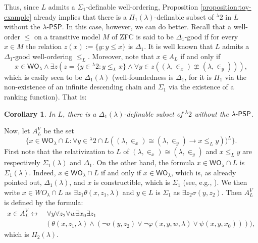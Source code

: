 \documentclass{amsart}
\numberwithin{equation}{section}
\def\hyp{{\hbox{-}}}
\newtheorem{corollary}[theorem]{Corollary}
\theoremstyle{definition}
\theoremstyle{remark}
\begin{document}
Thus, since $L$ admits a $\Sigma_1$-definable well-ordering, Proposition \ref{proposition:toy-example} already implies that there is a $\Pi_1(\lambda)$-definable subset of ${}^{\lambda}2$ in $L$ without the $\lambda$-$\mathsf{PSP}$. In this case, however, we can do better. Recall that a well-order $\leq$ on a transitive model $M$ of \textsf{ZFC} is said to be $\Delta_1$-good if for every $x\in M$ the relation $z(x):=\{y:y\leq x\}$ is $\Delta_1$. It is well known that $L$ admits a $ \Delta_1$-good well-ordering $\leq_L$.  
Moreover, note that $x\in A_L$ if and only if
\[
x\in\mathsf{WO}_\lambda\wedge\exists z(z=\{y\in{}^{\lambda}2:y\leq_{L}x\}\wedge \forall y\in z((\lambda,\in_x)\ncong(\lambda,\in_y))),
\]
which is easily seen to be $\Delta_1(\lambda)$ (well-foundedness is $\Delta_1$, for it is $\Pi_1$ via the non-existence of an infinite descending chain and $\Sigma_1$ via the existence of a ranking function). That is:

\begin{corollary}\label{corollary:toy-example-Delta_1-definable-subset-wo-psp} In $L$, there is a $\Delta_1(\lambda)$-definable subset of ${}^{\lambda}2$ without the $\lambda\hyp\mathsf{PSP}$.
\end{corollary}


Now, let $A_{L}^{V}$ be the set
$$\{x\in \mathsf{WO}_{\lambda}\cap L:\forall y\in{}^{\lambda}2\cap L((\lambda,\in_x)\cong(\lambda,\in_y)\rightarrow x\leq_{L}y))^{L}\}.$$
First note that the relativization to $L$ of $(\lambda,\in_x)\cong(\lambda,\in_y)$ and $x\leq_{L}y$ are respectively $\Sigma_1(\lambda)$ and $\Delta_1$.  On the other hand, the formula $x\in \mathsf{WO}_{\lambda}\cap L$ is $\Sigma_1(\lambda)$. Indeed, $x\in \mathsf{WO}_{\lambda}\cap L$ if and only if $x\in \mathsf{WO}_{\lambda}$, which is, as already pointed out, $\Delta_1(\lambda)$, and $x$ is constructible, which is $\Sigma_1$ (see, e.g., \cite[Lemma 2.13]{Devlin}). We then write $x\in WO_{\lambda}\cap L$ as $\exists z_1\theta(x,z_1,\lambda)$ and $y\in L$ is $\Sigma_1$ as $\exists z_2\sigma(y,z_2)$. Then $A_{L}^V$ is defined by the formula:
\begin{equation*}
	\begin{split}
		x\in A_{L}^V \leftrightarrow& \,\forall y\forall z_2\forall w\exists x_{0}\exists z_1 \\&(\theta(x,z_1,\lambda)\wedge(\neg\sigma(y,z_2)\vee\neg\varphi(x,y,w,\lambda)\vee\psi(x,y,x_{0})))),
	\end{split}
\end{equation*}
which is $\Pi_2(\lambda)$.
\end{document}
